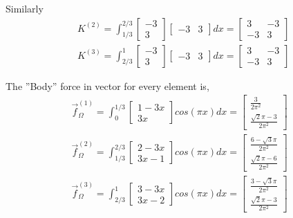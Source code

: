 \documentclass[a4paper]{memoir}
\begin{document}
Similarly
\begin{align*}
	& K^{(2)} = \int_{1/3}^{2/3} 
	\begin{bmatrix}
		-3 \\
		3
	\end{bmatrix}
	\begin{bmatrix}
		-3 & 3 
	\end{bmatrix}
	dx = 
	\begin{bmatrix}
		 3 & -3 \\
		-3 &  3
	\end{bmatrix}	\\
	& K^{(3)} = \int_{2/3}^{1} 
	\begin{bmatrix}
		-3 \\
		3
	\end{bmatrix}
	\begin{bmatrix}
		-3 & 3 
	\end{bmatrix}
	dx = 
	\begin{bmatrix}
		 3 & -3 \\
		-3 &  3
	\end{bmatrix}		
\end{align*}

The ''Body'' force in vector for every element is,
\begin{align*}
	\vec{f}_\Omega^{(1)} = \int_{0}^{1/3} 
	\begin{bmatrix}
		1-3x \\
		3x
	\end{bmatrix}
	cos(\pi x)dx = 
	\begin{bmatrix}
		\frac{3}{2 \pi^2} \\
		\frac{\sqrt{2}\pi-3}{2 \pi^2}
	\end{bmatrix}\\
	\vec{f}_\Omega^{(2)} = \int_{1/3}^{2/3} 
	\begin{bmatrix}
		2-3x \\
		3x-1
	\end{bmatrix}
	cos(\pi x)dx = 
	\begin{bmatrix}
		\frac{6-\sqrt{3}\pi}{2 \pi^2} \\
		\frac{\sqrt{2}\pi-6}{2 \pi^2}
	\end{bmatrix} \\
	\vec{f}_\Omega^{(3)} = \int_{2/3}^{1} 
	\begin{bmatrix}
		3-3x \\
		3x-2
	\end{bmatrix}
	cos(\pi x)dx = 
	\begin{bmatrix}
		\frac{3-\sqrt{3}\pi}{2 \pi^2} \\
		\frac{\sqrt{2}\pi-3}{2 \pi^2}
	\end{bmatrix}
\end{align*}
\end{document}
